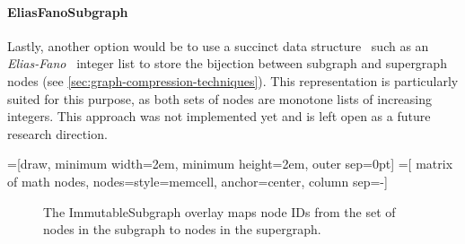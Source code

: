 \paragraph{EliasFanoSubgraph}
Lastly, another option would be to use a succinct data structure~\cite{NavCDS}
such as an \emph{Elias-Fano}~\cite{EliESRCASF} integer list to store the
bijection between subgraph and supergraph nodes (see
\cref{sec:graph-compression-techniques}). This representation is particularly
suited for this purpose, as both sets of nodes are monotone lists of increasing
integers. This approach was not implemented yet and is left open as a future
research direction.

=[draw, minimum width=2em, minimum height=2em, outer sep=0pt]
=[
    matrix of math nodes,
    nodes={style=memcell, anchor=center},
    column sep=-\pgflinewidth]

\begin{figure}
    \centering
    \caption{The ImmutableSubgraph overlay maps node IDs from the set of nodes
    in the subgraph to nodes in the supergraph.}%
    \label{fig:immutablesubgraph}
\end{figure}

